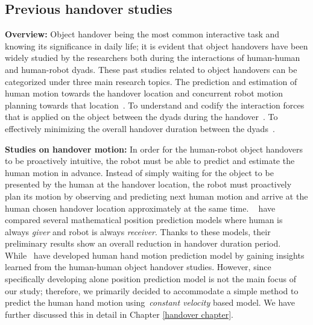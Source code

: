 \subsection{Previous handover studies}

\textbf{Overview:} Object handover being the most common interactive task and knowing its significance in daily life; it is evident that object handovers have been widely studied by the researchers both during the interactions of human-human and human-robot dyads. These past studies related to object handovers can be categorized under three main research topics. The prediction and estimation of human motion towards the handover location and concurrent robot motion planning towards that location~\cite{huber2008Indus, li2015predicting, waldhart2015planning, mainprice2012sharing, vahrenkamp2009humanoid, kim2004advanced, mainprice2010planning}. To understand and codify the interaction forces that is applied on the object between the dyads during the handover~\cite{chan2014implementation, medina2016human, chan2013human, sadigh2009safe, nagata1998delivery}. To effectively minimizing the overall handover duration between the dyads~\cite{nemlekarprompt, cakmak2011using, huber2008human, nemlekar2019object}.

\textbf{Studies on handover motion:} In order for the human-robot object handovers to be proactively intuitive, the robot must be able to predict and estimate the human motion in advance. Instead of simply waiting for the object to be presented by the human at the handover location, the robot must proactively plan its motion by observing and predicting next human motion and arrive at the human chosen handover location approximately at the same time. ~\cite{li2015predicting} have compared several mathematical position prediction models where human is always \textit{giver} and robot is always \textit{receiver}. Thanks to these models, their preliminary results show an overall reduction in handover duration period. While~\cite{perez2015fast, sheikholeslami2018prediction, vogt2017system, kupcsik2016learning}  have developed human hand motion prediction model by gaining insights learned from the human-human object handover studies. However, since specifically developing alone position prediction model is not the main focus of our study; therefore, we primarily decided to accommodate a simple method to predict the human hand motion using~\textit{constant velocity} based model. We have further discussed this in detail in Chapter \ref{handover chapter}.

